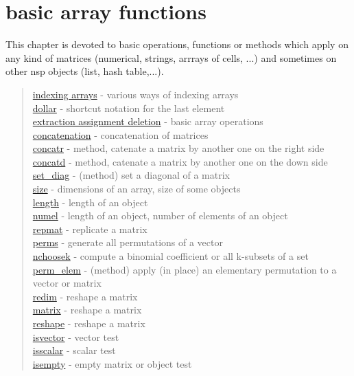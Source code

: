 \chapter*{basic array functions}

\hypertarget{arrays}{}

This chapter is devoted to basic operations, functions or methods which apply on
any kind of matrices (numerical, strings, arrrays of cells, ...) and sometimes
on other nsp objects (list, hash table,...).

\begin{quote}
\noindent
\hyperlink{indexing arrays}{indexing arrays} - various ways of indexing arrays \\
\hyperlink{dollar}{dollar} - shortcut notation for the last element\\
\hyperlink{extraction assignment deletion}{extraction assignment deletion} - basic array operations\\
\hyperlink{concatenation}{concatenation} - concatenation of matrices\\
\hyperlink{concatr}{concatr} - method, catenate a matrix by another one on the right side\\   
\hyperlink{concatd}{concatd} - method, catenate a matrix by another one on the down side\\   
\hyperlink{set_diag}{set\_diag} - (method) set a diagonal of a matrix \\
\hyperlink{size}{size} - dimensions of an array, size of some objects \\
\hyperlink{length}{length} - length of an object  \\
\hyperlink{numel}{numel} - length of an object, number of elements of an object  \\
\hyperlink{repmat}{repmat} - replicate a matrix\\
\hyperlink{perms}{perms} - generate all permutations of a vector\\
\hyperlink{nchoosek}{nchoosek} - compute a binomial coefficient or all k-subsets of a set \\
\hyperlink{perm_elem}{perm\_elem} - (method) apply (in place) an elementary permutation to a vector or matrix \\
\hyperlink{redim}{redim} - reshape a matrix\\
\hyperlink{matrix}{matrix} - reshape a matrix\\
\hyperlink{reshape}{reshape} - reshape a matrix\\
\hyperlink{isvector}{isvector} - vector test\\
\hyperlink{isscalar}{isscalar} - scalar test\\
\hyperlink{isempty}{isempty} - empty matrix or object test\\
\end{quote}



  








